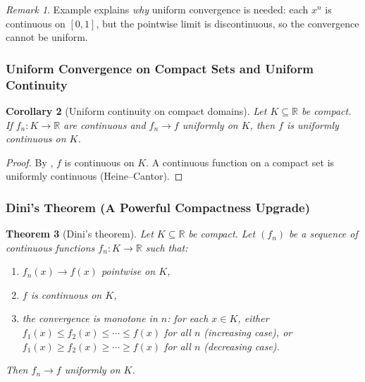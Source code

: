 \documentclass[12pt]{article}
\numberwithin{equation}{section}
\newcommand{\RR}{\mathbb{R}}
\theoremstyle{plain}
\newtheorem{theorem}{Theorem}[section]
\newtheorem{corollary}[theorem]{Corollary}
\theoremstyle{definition}
\theoremstyle{remark}
\newtheorem{remark}[theorem]{Remark}
\begin{document}
\begin{remark}
Example  explains \emph{why} uniform convergence is needed:
each $x^n$ is continuous on $[0,1]$, but the pointwise limit is discontinuous, so the convergence cannot be uniform.
\end{remark}

\subsubsection{Uniform Convergence on Compact Sets and Uniform Continuity}

\begin{corollary}[Uniform continuity on compact domains]\label{cor:unifcont-compact}
Let $K\subseteq\RR$ be compact.
If $f_n:K\to\RR$ are continuous and $f_n\to f$ uniformly on $K$, then $f$ is uniformly continuous on $K$.
\end{corollary}

\begin{proof}
By , $f$ is continuous on $K$.
A continuous function on a compact set is uniformly continuous (Heine--Cantor).
\end{proof}

\subsubsection{Dini's Theorem (A Powerful Compactness Upgrade)}

\begin{theorem}[Dini's theorem]\label{thm:dini}
Let $K\subseteq\RR$ be compact.
Let $(f_n)$ be a sequence of continuous functions $f_n:K\to\RR$ such that:
\begin{enumerate}[label=(\alph*)]
\item $f_n(x)\to f(x)$ pointwise on $K$,
\item $f$ is continuous on $K$,
\item the convergence is monotone in $n$: for each $x\in K$, either
$f_1(x)\le f_2(x)\le \cdots \le f(x)$ for all $n$ (increasing case),
or $f_1(x)\ge f_2(x)\ge \cdots \ge f(x)$ for all $n$ (decreasing case).
\end{enumerate}
Then $f_n\to f$ uniformly on $K$.
\end{theorem}
\end{document}
